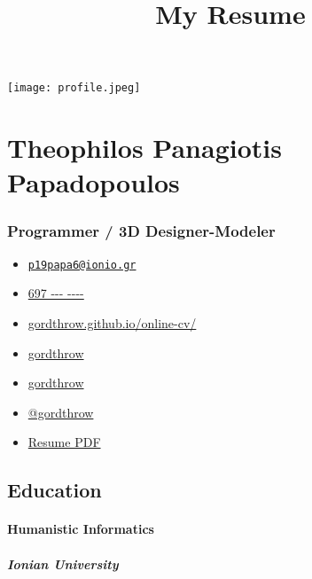 \documentclass[english,]{article}
\title{My Resume}
\date{}
\providecommand{\tightlist}{%
  \setlength{\itemsep}{0pt}\setlength{\parskip}{0pt}}
\let\oldparagraph\paragraph
\renewcommand{\paragraph}[1]{\oldparagraph{#1}\mbox{}}
\let\oldsubparagraph\subparagraph
\renewcommand{\subparagraph}[1]{\oldsubparagraph{#1}\mbox{}}
\begin{document}
\maketitle

\texttt{[image: profile.jpeg]}

\hypertarget{theophilos-panagiotis-papadopoulos}{%
\section{Theophilos Panagiotis
Papadopoulos}\label{theophilos-panagiotis-papadopoulos}}

\hypertarget{programmer-3d-designer-modeler}{%
\subsubsection{Programmer / 3D
Designer-Modeler}\label{programmer-3d-designer-modeler}}

\begin{itemize}
\tightlist
\item
  \emph{} \href{mailto:p19papa6@ionio.gr}{\nolinkurl{p19papa6@ionio.gr}}
\item
  \emph{} \href{tel:697\%20---\%20----}{697 -\/-\/- -\/-\/-\/-}
\item
  \emph{}
  \href{http://gordthrow.github.io/online-cv/}{gordthrow.github.io/online-cv/}
\item
  \emph{} \href{https://linkedin.com/in/gordthrow}{gordthrow}
\item
  \emph{} \href{http://github.com/gordthrow}{gordthrow}
\item
  \emph{} \href{https://twitter.com/@gordthrow}{@gordthrow}
\item
  \emph{} \href{http://www.africau.edu/images/default/sample.pdf}{Resume
  PDF}
\end{itemize}

\hypertarget{education}{%
\subsection{Education}\label{education}}

\hypertarget{humanistic-informatics}{%
\paragraph{Humanistic Informatics}\label{humanistic-informatics}}

\hypertarget{ionian-university}{%
\subparagraph{Ionian University}\label{ionian-university}}
\end{document}
